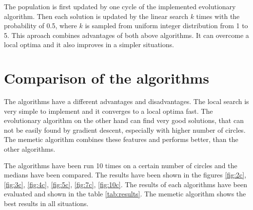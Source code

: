 \documentclass[paper=a4, fontsize=11pt]{scrartcl} %
\numberwithin{equation}{section} %
\numberwithin{figure}{section} %
\numberwithin{table}{section} %
\begin{document}
The population is first updated by one cycle of the implemented evolutionary algorithm. Then each solution is updated by the linear search $k$ times with the probability of 0.5, where $k$ is sampled from uniform integer distribution from 1 to 5. This aproach combines advantages of both above algorithms. It can overcome a local optima and it also improves in a simpler situations.

\section{Comparison of the algorithms}

The algorithms have a different advantages and disadvantages. The local search is very simple to implement and it converges to a local optima fast. The evolutionary algorithm on the other hand can find very good solutions, that can not be easily found by gradient descent, especially with higher number of circles. The memetic algorithm combines these features and performs better, than the other algorithms.

The algorithms have been run 10 times on a certain number of circles and the medians have been compared. The results have been shown in the figures \ref{fig:2c}, \ref{fig:3c}, \ref{fig:4c}, \ref{fig:5c}, \ref{fig:7c}, \ref{fig:10c}. The results of each algorithms have been evaluated and shown in the table \ref{tab:results}. The memetic algorithm shows the best results in all situations.
\end{document}
